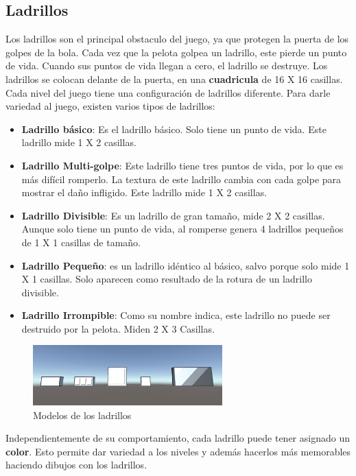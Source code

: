 \subsection{Ladrillos}
Los ladrillos son el principal obstaculo del juego, ya que protegen la puerta de los golpes de la bola. Cada vez que la pelota golpea un ladrillo, este pierde un punto de vida. Cuando sus puntos de vida llegan a cero, el ladrillo se destruye. Los ladrillos se colocan delante de la puerta, en una \textbf{cuadricula} de 16 X 16 casillas. Cada nivel del juego tiene una configuración de ladrillos diferente. Para darle variedad al juego, existen varios tipos de ladrillos:
\begin{itemize}
\item \textbf{Ladrillo básico}: Es el ladrillo básico. Solo tiene un punto de vida. Este ladrillo mide 1 X 2 casillas.
\item \textbf{Ladrillo Multi-golpe}: Este ladrillo tiene tres puntos de vida, por lo que es más difícil romperlo. La textura de este ladrillo cambia con cada golpe para mostrar el daño infligido. Este ladrillo mide 1 X 2 casillas.
\item \textbf{Ladrillo Divisible}: Es un ladrillo de gran tamaño, mide 2 X 2 casillas. Aunque solo tiene un punto de vida, al romperse genera 4 ladrillos pequeños de 1 X 1 casillas de tamaño.
\item \textbf{Ladrillo Pequeño}: es un ladrillo idéntico al básico, salvo porque solo mide 1 X 1 casillas. Solo aparecen como resultado de la rotura de un ladrillo divisible.
\item \textbf{Ladrillo Irrompible}: Como su nombre indica, este ladrillo no puede ser destruido por la pelota. Miden 2 X 3 Casillas.
\end{itemize}

\begin{figure}[h]
	\includegraphics[width=0.65\textwidth]{images/estructura/objetos/brick_examples}
	\centering
	\caption{Modelos de los ladrillos}
\end{figure}

Independientemente de su comportamiento, cada ladrillo puede tener asignado un \textbf{color}. Esto permite dar variedad a los niveles y además hacerlos más memorables haciendo dibujos con los ladrillos.

